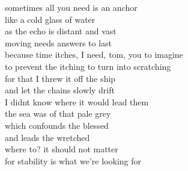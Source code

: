 sometimes all you need is an anchor\\
like a cold glass of water\\
as the echo is distant and vast\\
moving needs answers to last\\


because time itches, I need, tom, you to imagine\\
to prevent the itching to turn into scratching\\
for that I threw it off the ship\\
and let the chains slowly drift\\
I didnt know where it would lead them\\

the sea was of that pale grey\\
which confounds the blessed\\
and leads the wretched\\
where to? it should not matter\\
for stability is what we're looking for
